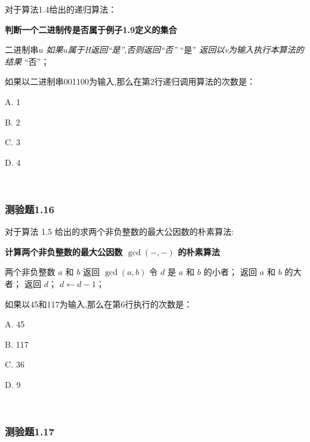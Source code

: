 \documentclass[UTF8, heading=true]{ctexart}
\begin{document}
对于算法1.4给出的递归算法：

\begin{algorithm}
    \caption{\textbf{判断一个二进制传是否属于例子1.9定义的集合}}
    \begin{algorithmic}[1]
        \Require 二进制串$u$
        \Ensure \textit{如果$u$属于H返回“是”,否则返回“否”}
        \State \Return “是”
        \EndIf
        \State \textit{返回以v为输入执行本算法的结果}
        \Else 
        \State \Return “否”；
        \EndIf
    \end{algorithmic}
\end{algorithm}

如果以二进制串001100为输入,那么在第2行递归调用算法的次数是：

A. 1

B. 2

C. 3

D. 4

\textcolor{white}{答案：B}

\subsubsection{测验题1.16}

对于算法 1.5 给出的求两个非负整数的最大公因数的朴素算法:

\begin{algorithm}
  \caption{\textbf{计算两个非负整数的最大公因数 $\operatorname{gcd}(-,-)$ 的朴素算法}}
  \begin{algorithmic}[1]
    \Require 两个非负整数 $a$ 和 $b$
    \Ensure 返回 $\operatorname{gcd}(a, b)$
    \State 令 $d$ 是 $a$ 和 $b$ 的小者；
    \State 返回 $a$ 和 $b$ 的大者；
    \EndIf
    \State 返回 $d$；
    \EndIf
    \State $d \gets d-1$；
    \EndWhile
  \end{algorithmic}
\end{algorithm}

如果以45和117为输入,那么在第6行执行的次数是：

A. 45

B. 117

C. 36

D. 9




\textcolor{white}{答案：C}

\subsubsection{测验题1.17}
\end{document}
